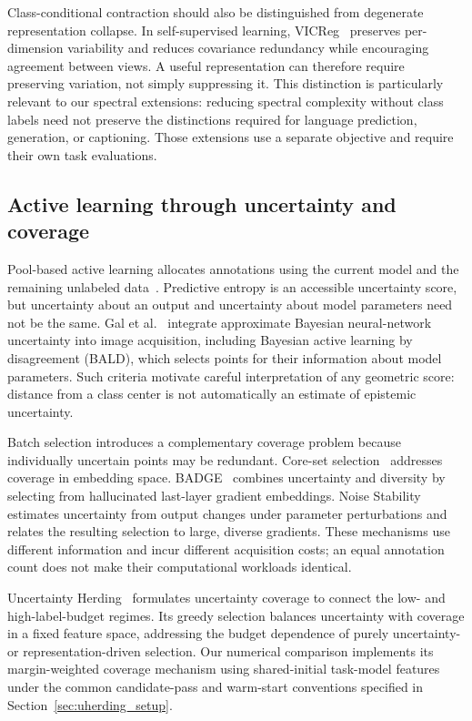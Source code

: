 \documentclass[10pt,a4paper,twocolumn]{article}
\begin{document}
Class-conditional contraction should also be distinguished from
degenerate representation collapse. In self-supervised learning,
VICReg~\cite{bardes2022vicreg} preserves per-dimension variability and
reduces covariance redundancy while encouraging agreement between
views. A useful representation can therefore require preserving
variation, not simply suppressing it. This distinction is particularly
relevant to our spectral extensions: reducing spectral complexity
without class labels need not preserve the distinctions required for
language prediction, generation, or captioning. Those extensions use
a separate objective and require their own task evaluations.

\subsection{Active learning through uncertainty and coverage}
\label{sec:related_acquisition}

Pool-based active learning allocates annotations using the current
model and the remaining unlabeled data~\cite{settles2009active}.
Predictive entropy is an accessible uncertainty score, but uncertainty
about an output and uncertainty about model parameters need not be
the same. Gal et al.~\cite{gal2017bayesian} integrate approximate
Bayesian neural-network uncertainty into image acquisition, including
Bayesian active learning by disagreement (BALD), which selects points
for their information about model parameters.
Such criteria motivate careful interpretation of any geometric score:
distance from a class center is not automatically an estimate of
epistemic uncertainty.

Batch selection introduces a complementary coverage problem because
individually uncertain points may be redundant. Core-set
selection~\cite{sener2018active} addresses coverage in embedding space.
BADGE~\cite{ash2020badge} combines uncertainty and diversity by selecting
from hallucinated last-layer gradient embeddings. Noise
Stability~\cite{li2024noise} estimates uncertainty from output changes
under parameter perturbations and relates the resulting selection to
large, diverse gradients. These mechanisms use different information
and incur different acquisition costs; an equal annotation count does
not make their computational workloads identical.

Uncertainty Herding~\cite{bae2025uncertainty} formulates uncertainty
coverage to connect the low- and high-label-budget regimes. Its greedy
selection balances uncertainty with coverage in a fixed feature space,
addressing the budget dependence of purely uncertainty- or
representation-driven selection. Our numerical comparison implements
its margin-weighted coverage mechanism using shared-initial task-model
features under the common candidate-pass and warm-start conventions
specified in Section~\ref{sec:uherding_setup}.
\end{document}
